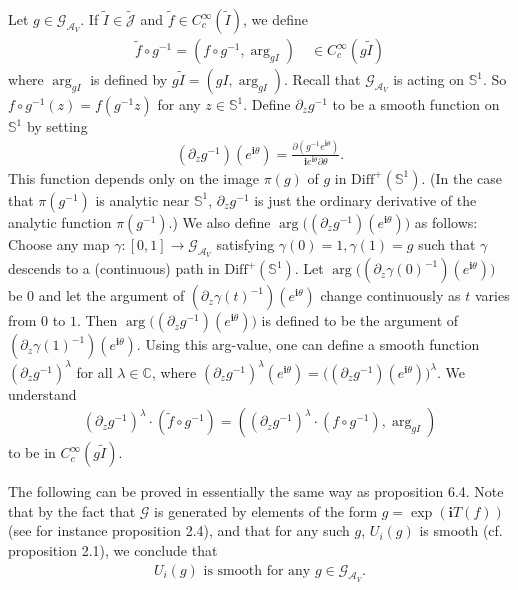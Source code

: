 \documentclass[12pt,a4paper]{article}
\theoremstyle{definition}
\theoremstyle{plain}
\newcommand{\wtd}{\widetilde}
\newcommand{\Diffp}{\mathrm{Diff}^+}
\newcommand{\GAV}{\mathscr G_{\mathcal A_V}}
\newcommand{\scr}{\mathscr}
\newcommand{\Jtd}{\widetilde{\mathcal J}}
\newcommand{\im}{\mathbf{i}}
\newcommand{\mbb}{\mathbb}
\numberwithin{equation}{subsection}
\begin{document}
Let $g\in\GAV$. If $\wtd I\in\Jtd$ and $\wtd f\in C_c^\infty(\wtd I)$, we define 
\begin{align}
\wtd f\circ g^{-1}=(f\circ g^{-1},\arg_{gI})\quad \in C_c^\infty(g\wtd I)
\end{align}
where $\arg_{gI}$ is defined by $g\wtd I=(gI,\arg_{gI})$.  Recall that $\GAV$ is acting on $\mbb S^1$. So $f\circ g^{-1}(z)=f(g^{-1}z)$ for any $z\in\mbb S^1$. Define $\partial_zg^{-1}$ to be a smooth function on $\mbb S^1$ by setting
\begin{align}
(\partial_zg^{-1})(e^{\im \theta})=\frac{\partial (g^{-1}e^{\im\theta})}{\im e^{\im\theta}\partial\theta}.
\end{align}
This function depends only on the image $\pi(g)$ of $g$ in $\Diffp(\mbb S^1)$. (In the case that $\pi(g^{-1})$ is analytic near $\mbb S^1$, $\partial_zg^{-1}$ is just the ordinary derivative of the analytic function $\pi(g^{-1})$.) We also define $\arg \big((\partial_zg^{-1})(e^{\im \theta})\big)$ as follows: Choose any map  $\gamma:[0,1]\rightarrow\GAV$ satisfying $\gamma(0)=1,\gamma(1)=g$ such that $\gamma$ descends to a (continuous) path in $\Diffp(\mbb S^1)$. Let  $\arg \big((\partial_z\gamma(0)^{-1})(e^{\im \theta})\big)$ be $0$ and let the argument of $(\partial_z\gamma(t)^{-1})(e^{\im \theta})$ change continuously as $t$ varies from $0$ to $1$. Then $\arg \big((\partial_zg^{-1})(e^{\im \theta})\big)$ is defined to be the argument of $(\partial_z\gamma(1)^{-1})(e^{\im \theta})$. Using this arg-value, one can define a smooth function $(\partial_zg^{-1})^\lambda$ for all $\lambda\in\mbb C$, where $(\partial_zg^{-1})^\lambda(e^{\im\theta})=\big((\partial_zg^{-1})(e^{\im \theta})\big)^\lambda$. We understand
\begin{align*}
(\partial_zg^{-1})^\lambda\cdot  (\wtd f\circ g^{-1})=((\partial_zg^{-1})^\lambda\cdot(f\circ g^{-1}),\arg_{gI})
\end{align*}
to be in $C_c^\infty(g\wtd I)$. 

The following can be proved in essentially the same way as \cite{CKLW18} proposition 6.4. Note that  by the fact that $\scr G$ is generated by elements of the form $g=\exp(\im T(f))$ (see for instance \cite{Gui21a} proposition 2.4), and that for any such $g$, $U_i(g)$ is smooth (cf. \cite{TL99} proposition 2.1), we conclude that %
\begin{align}\label{eq51}
\text{$U_i(g)$ is smooth for any $g\in\GAV$}.
\end{align}
\end{document}
